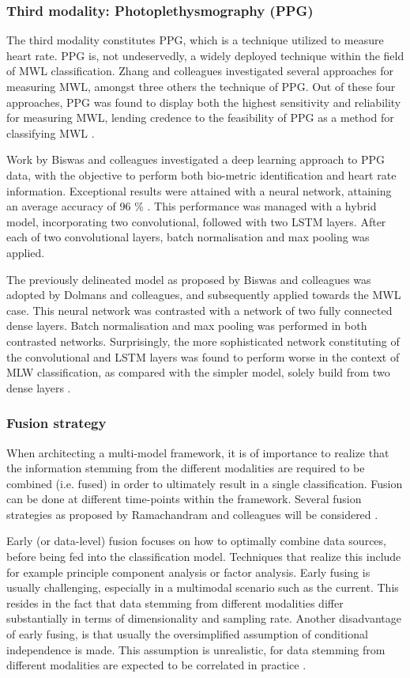 \documentclass{article}
\begin{document}
\subsubsection{Third modality: Photoplethysmography (PPG)}
The third modality constitutes PPG, which is a technique utilized to measure heart rate. PPG is, not undeservedly, a widely deployed technique within the field of MWL classification. Zhang and colleagues investigated several approaches for measuring MWL, amongst three others the technique of PPG. Out of these four approaches, PPG was found to display both the highest sensitivity and reliability for measuring MWL, lending credence to the feasibility of PPG as a method for classifying MWL \cite{zhang2018evaluating}. 

Work by Biswas and colleagues investigated a deep learning approach to PPG data, with the objective to perform both bio-metric identification and heart rate information. Exceptional results were attained with a neural network, attaining an average accuracy of 96 \% \cite{biswas2019cornet}. This performance was managed with a hybrid model, incorporating two convolutional, followed with two LSTM layers. After each of two convolutional layers, batch normalisation and max pooling was applied. 

The previously delineated model as proposed by Biswas and colleagues was adopted by Dolmans and colleagues, and subsequently applied towards the MWL case. This neural network was contrasted with a network of two fully connected dense layers. Batch normalisation and max pooling was performed in both contrasted networks. Surprisingly, the more sophisticated network constituting of the convolutional and LSTM layers was found to perform worse in the context of MLW classification, as compared with the simpler model, solely build from two dense layers \cite{dolmans2020perceived}.   

\subsubsection{Fusion strategy}  
When architecting a multi-model framework, it is of importance to realize that the information stemming from the different modalities are required to be combined (i.e. fused) in order to ultimately result in a single classification. Fusion can be done at different time-points within the framework. Several fusion strategies as proposed by Ramachandram and colleagues will be considered \cite{ramachandram2017deep}.

Early (or data-level) fusion focuses on how to optimally combine data sources, before being fed into the classification model. Techniques that realize this include for example principle component analysis or factor analysis. Early fusing is usually challenging, especially in a multimodal scenario such as the current. This resides in the fact that data stemming from different modalities differ substantially in terms of dimensionality and sampling rate. Another disadvantage of early fusing, is that usually the oversimplified assumption of conditional independence is made. This assumption is unrealistic, for data stemming from different modalities are expected to be correlated in practice \cite{ramachandram2017deep}. 
\end{document}
